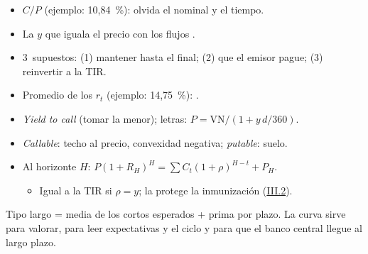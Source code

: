 \documentclass{article}
\begin{document}
\begin{columnas}
\begin{itemize}
\item $C/P$ (ejemplo: 10,84~\%): olvida el nominal y el tiempo.
\end{itemize}
\begin{itemize}
\item La $y$ que iguala el precio con los flujos .
\item 3~supuestos: (1) mantener hasta el final; (2) que el emisor pague; (3) reinvertir a la TIR.
\item Promedio de los $r_t$ (ejemplo: 14,75~\%): .
\item \emph{Yield to call} (tomar la menor); letras: $P=\mathrm{VN}/(1+y\,d/360)$.
\item \emph{Callable}: techo al precio, convexidad negativa; \emph{putable}: suelo.
\end{itemize}
\begin{itemize}
\item Al horizonte $H$: $P(1+R_H)^H=\sum C_t(1+\rho)^{H-t}+P_H$.
  \begin{itemize}
  \item Igual a la TIR si $\rho=y$; la protege la inmunización (\hyperref[rep:III.2]{III.2}).
  \end{itemize}
\end{itemize}

\begin{ideaclave}
Tipo largo = media de los cortos esperados + prima por plazo. La curva sirve para valorar, para leer expectativas y el ciclo y para que el banco central llegue al largo plazo.
\end{ideaclave}


\end{columnas}
\end{document}
